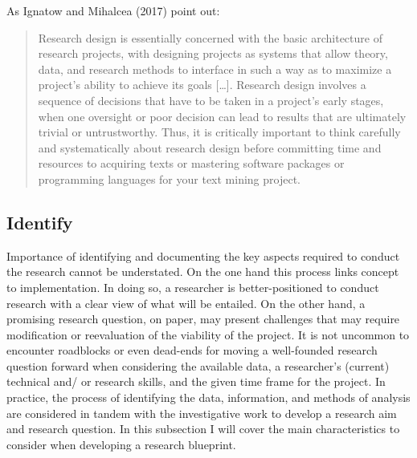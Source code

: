 \documentclass[
  letterpaper,
]{latex/krantz}
\begin{document}
As Ignatow and Mihalcea (2017) point out:

\begin{quote}
Research design is essentially concerned with the basic architecture of
research projects, with designing projects as systems that allow theory,
data, and research methods to interface in such a way as to maximize a
project's ability to achieve its goals {[}\ldots{]}. Research design
involves a sequence of decisions that have to be taken in a project's
early stages, when one oversight or poor decision can lead to results
that are ultimately trivial or untrustworthy. Thus, it is critically
important to think carefully and systematically about research design
before committing time and resources to acquiring texts or mastering
software packages or programming languages for your text mining project.
\end{quote}

\hypertarget{identify}{%
\subsection{Identify}\label{identify}}

Importance of identifying and documenting the key aspects required to
conduct the research cannot be understated. On the one hand this process
links concept to implementation. In doing so, a researcher is
better-positioned to conduct research with a clear view of what will be
entailed. On the other hand, a promising research question, on paper,
may present challenges that may require modification or reevaluation of
the viability of the project. It is not uncommon to encounter roadblocks
or even dead-ends for moving a well-founded research question forward
when considering the available data, a researcher's (current) technical
and/ or research skills, and the given time frame for the project. In
practice, the process of identifying the data, information, and methods
of analysis are considered in tandem with the investigative work to
develop a research aim and research question. In this subsection I will
cover the main characteristics to consider when developing a research
blueprint.
\end{document}
